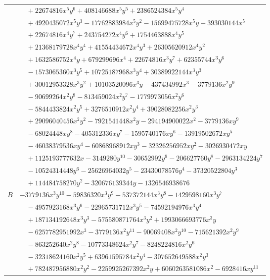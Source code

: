 \documentclass[11pt]{article}
\begin{document}
\begin{longtable}{@{}ll@{}}
 & $\quad +22674816x^{5}y^{6}+408146688x^{5}y^{5}+2386524384x^{5}y^{4}$\\
 & $\quad +4920435072x^{5}y^{3}-17762883984x^{5}y^{2}-15699475728x^{5}y+393030144x^{5}$\\
 & $\quad +22674816x^{4}y^{7}+243754272x^{4}y^{6}+1754463888x^{4}y^{5}$\\
 & $\quad +21368179728x^{4}y^{4}+41554434672x^{4}y^{3}+26305620912x^{4}y^{2}$\\
 & $\quad +1632586752x^{4}y+679299696x^{4}+22674816x^{3}y^{7}+62355744x^{3}y^{6}$\\
 & $\quad -1573065360x^{3}y^{5}+10725187968x^{3}y^{4}+30389922144x^{3}y^{3}$\\
 & $\quad +30012953328x^{3}y^{2}+10103520096x^{3}y-437434992x^{3}-3779136x^{2}y^{9}$\\
 & $\quad -90699264x^{2}y^{8}-813459024x^{2}y^{7}-1779973056x^{2}y^{6}$\\
 & $\quad -5844433824x^{2}y^{5}+3276510912x^{2}y^{4}+39028082256x^{2}y^{3}$\\
 & $\quad +29096040456x^{2}y^{2}-7921541448x^{2}y-294194900022x^{2}-3779136xy^{9}$\\
 & $\quad -68024448xy^{8}-405312336xy^{7}-1595740176xy^{6}-13919502672xy^{5}$\\
 & $\quad -46038379536xy^{4}-60868968912xy^{3}-32326256952xy^{2}-3026930472xy$\\
 & $\quad +1125193777632x-3149280y^{10}-30652992y^{9}-206627760y^{8}-2963134224y^{7}$\\
 & $\quad -10524314448y^{6}-25626964032y^{5}-23430078576y^{4}-37320522804y^{3}$\\
 & $\quad +114484758270y^{2}-320676139344y-1326546938676$\\
$B$ & $-3779136x^{3}y^{10}-59836320x^{3}y^{9}-537372144x^{3}y^{8}-1429598160x^{3}y^{7}$\\
 & $\quad -4957923168x^{3}y^{6}-22965731712x^{3}y^{5}-74592194976x^{3}y^{4}$\\
 & $\quad +187134192648x^{3}y^{3}-575580871764x^{3}y^{2}+1993066693776x^{3}y$\\
 & $\quad -6257782951992x^{3}-3779136x^{2}y^{11}-90069408x^{2}y^{10}-715621392x^{2}y^{9}$\\
 & $\quad -863252640x^{2}y^{8}-10773348624x^{2}y^{7}-8248224816x^{2}y^{6}$\\
 & $\quad -32318624160x^{2}y^{5}+63961595784x^{2}y^{4}-307652649588x^{2}y^{3}$\\
 & $\quad +782487956880x^{2}y^{2}-2259925267392x^{2}y+6060263581086x^{2}-6928416xy^{11}$\\

\end{longtable}
\end{document}
